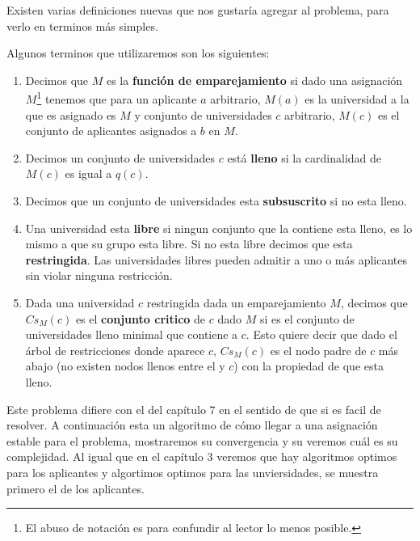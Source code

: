 Existen varias definiciones nuevas que nos gustaría agregar al problema, para verlo en terminos más simples.
\begin{dfn}
Algunos terminos que utilizaremos son los siguientes:
\begin{enumerate}

\item Decimos que $M$ es la \textbf{función de emparejamiento} si dado una asignación $M$\footnote{El abuso de notación es para confundir al lector lo menos posible.} tenemos que para un aplicante $a$ arbitrario, $M(a)$ es la universidad a la que es asignado es $M$ y  conjunto de universidades $c$ arbitrario, $M(c)$ es el conjunto de aplicantes asignados a $b$ en $M$.
\item Decimos un conjunto de universidades $c$ está \textbf{lleno} si la cardinalidad de $M(c)$ es igual a $q(c)$. 
\item Decimos que un conjunto de universidades esta \textbf{subsuscrito} si no esta lleno. 
\item Una universidad esta \textbf{libre} si ningun conjunto que la contiene esta lleno, es lo mismo a que su grupo esta libre. Si no esta libre decimos que esta \textbf{restringida}. Las universidades libres pueden admitir a uno o más aplicantes sin violar ninguna restricción. 
\item Dada una universidad $c$ restringida dada un emparejamiento $M$, decimos que $Cs_M(c)$ es el \textbf{conjunto critico} de $c$ dado $M$ si es el conjunto de universidades lleno minimal que contiene a $c$. Esto quiere decir que dado el árbol de restricciones donde aparece $c$, $Cs_M(c)$ es el nodo padre de $c$ más abajo (no existen nodos llenos entre el y $c$) con la propiedad de que esta lleno. 
\end{enumerate}
\end{dfn}



Este problema difiere con el del capítulo 7 en el sentido de que si es facil de resolver. A continuación esta un algoritmo de cómo llegar a una asignación estable para el problema, mostraremos su convergencia y su veremos cuál es su complejidad. Al igual que en el capítulo 3 veremos que hay algoritmos optimos para los aplicantes y algortimos optimos para las unviersidades, se muestra primero el de los aplicantes. %

